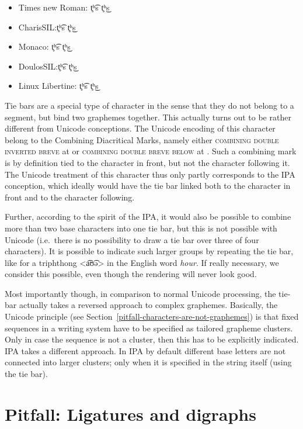 \begin{itemize}[itemsep=6pt]
  \item[] {Times new Roman: t̥ʰ͡s t̥ʰ͜s}
  \item[] {\small {}CharisSIL:\@ t̥ʰ͡s t̥ʰ͜s}
  \item[] {\footnotesize {}Monaco: t̥ʰ͡s t̥ʰ͜s}
  \item[] {DoulosSIL:\@ t̥ʰ͡s t̥ʰ͜s}
  \item[] Linux Libertine: t̥ʰ͡s t̥ʰ͜s
\end{itemize}

Tie bars are a special type of character in the sense that they do not belong to
a segment, but bind two graphemes together. This actually turns out to be rather
different from Unicode conceptions. The Unicode encoding of this character
belong to the Combining Diacritical Marks, namely either \textsc{combining double
inverted breve} at  or \textsc{combining double breve below} at
. Such a combining mark is by definition tied to the character in
front, but not the character following it. The Unicode treatment of this
character thus only partly corresponds to the IPA conception, which ideally
would have the tie bar linked both to the character in front and to the
character following. 

Further, according to the spirit of the IPA, it would also be possible to
combine more than two base characters into one tie bar, but this is not possible
with Unicode (i.e.~there is no possibility to draw a tie bar over three of four
characters). It is possible to indicate such larger groups by repeating the tie
bar, like for a triphthong <a͡ʊ͡ə> in the English word \textit{hour}. If really
necessary, we consider this possible, even though the rendering will never look
good. 

Most importantly though, in comparison to normal Unicode processing, the tie-bar
actually takes a reversed approach to complex graphemes. Basically, the Unicode
principle (see Section~\ref{pitfall-characters-are-not-graphemes}) is that fixed
sequences in a writing system have to be specified as tailored grapheme
clusters. Only in case the sequence is not a cluster, then this has to be
explicitly indicated. IPA takes a different approach. In IPA by default
different base letters are not connected into larger clusters; only when it is
specified in the string itself (using the tie bar).

\section{Pitfall: Ligatures and digraphs}
\label{pitfall-ligatures-digraphs}     

